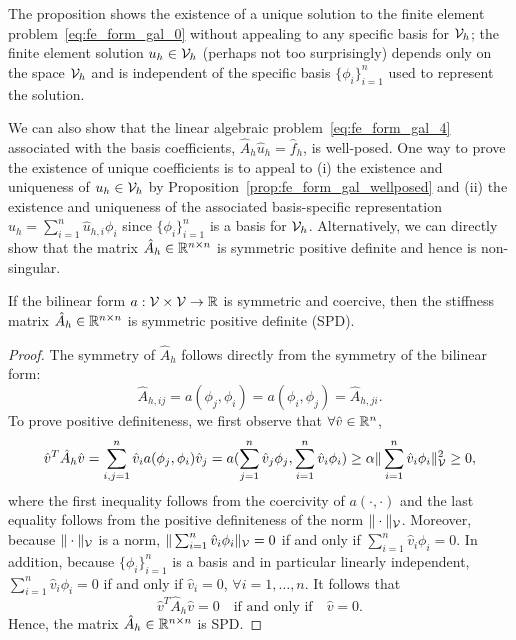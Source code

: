 The proposition shows the existence of a unique solution to the finite element problem~\eqref{eq:fe_form_gal_0} without appealing to any specific basis for $\mathcal{V}_h$; the finite element solution $u_h \in \mathcal{V}_h$ (perhaps not too surprisingly) depends only on the space $\mathcal{V}_h$ and is independent of the specific basis $\{ \phi_i \}_{i=1}^n$ used to represent the solution.

We can also show that the linear algebraic problem~\ref{eq:fe_form_gal_4} associated with the basis coefficients, $\hat A_h \hat u_h = \hat f_h$, is well-posed.  One way to prove the existence of unique coefficients is to appeal to (i) the existence and uniqueness of $u_h \in \mathcal{V}_h$ by Proposition~\eqref{prop:fe_form_gal_wellposed} and (ii) the existence and uniqueness of the associated basis-specific representation $u_h = \sum_{i=1}^n \hat u_{h,i} \phi_i$ since $\{\phi_i\}_{i=1}^n$ is a basis for $\mathcal{V}_h$. Alternatively, we can directly show that the matrix $\hat A_h \in \mathbb{R}^{n \times n}$ is symmetric positive definite and hence is non-singular. 
\begin{proposition}
  If the bilinear form $a: \mathcal{V} \times \mathcal{V} \to \mathbb{R}$ is symmetric and coercive, then the stiffness matrix $\hat A_h \in \mathbb{R}^{n \times n}$ is symmetric positive definite (SPD).
  \begin{proof}
    The symmetry of $\hat A_h$ follows directly from the symmetry of the bilinear form:
  \begin{equation*}
    \hat A_{h,ij} = a(\phi_j,\phi_i) = a(\phi_i,\phi_j) = \hat A_{h,ji}.
  \end{equation*}
  To prove positive definiteness, we first observe that $\forall \hat v \in \mathbb{R}^n$, 
\begin{equation*}
  \hat v^T \hat A_{h} \hat v
  =
  \sum_{i,j = 1}^n \hat v_i a(\phi_j, \phi_i) \hat v_j 
  = a(\sum_{j=1}^n \hat v_j \phi_j, \sum_{i=1}^n \hat v_i \phi_i)
  \geq \alpha \| \sum_{i=1}^n \hat v_i \phi_i \|^2_{\mathcal{V}} \geq 0,
\end{equation*}
where the first inequality follows from the coercivity of $a(\cdot,\cdot)$ and the last equality follows from the positive definiteness of the norm $\| \cdot \|_{\mathcal{V}}$. Moreover, because $\| \cdot \|_{\mathcal{V}}$ is a norm, $\| \sum_{i=1}^n \hat v_i \phi_i \|_{\mathcal{V}} = 0$ if and only if $\sum_{i=1}^n \hat v_i \phi_i = 0$.  In addition, because $\{\phi_i\}_{i=1}^n$ is a basis and in particular linearly independent, $\sum_{i=1}^n \hat v_i \phi_i = 0$ if and only if $\hat v_i = 0$, $\forall i = 1,\dots,n$. It follows that
\begin{equation*}
  \hat v^T \hat A_h \hat v = 0 \quad \text{if and only if} \quad \hat v = 0.
\end{equation*}
Hence, the matrix $\hat A_h \in \mathbb{R}^{n \times n}$ is SPD.
  \end{proof}
\end{proposition}

